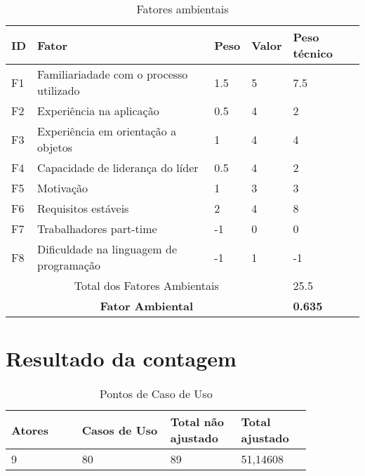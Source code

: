     \begin{table}[!h]
    \centering
    \caption{Fatores ambientais}
    \label{fatores_ambientais}
    \begin{tabular}{l|l|l|l|l}
    \hline
    ID  & Fator                                                          & Peso & Valor & Peso técnico\\
    \hline
    F1  & Familiariadade com o processo utilizado                        &  1.5  &  5  & 7.5  \\
    F2  & Experiência na aplicação                                       &  0.5  &  4  & 2  \\
    F3  & Experiência em orientação a objetos                            &   1   &  4  & 4  \\
    F4  & Capacidade de liderança do líder                               &  0.5  &  4  & 2  \\
    F5  & Motivação                                                      &   1   &  3  & 3  \\
    F6  & Requisitos estáveis                                            &   2   &  4  & 8  \\
    F7  & Trabalhadores part-time                                        &  -1   &  0  & 0  \\
    F8  & Dificuldade na linguagem de programação                        &  -1   &  1  & -1  \\
    \hline
    \multicolumn{4}{c}{Total dos Fatores Ambientais} & 25.5\\
    \hline
    \multicolumn{4}{c}{\textbf{Fator Ambiental}} & \textbf{0.635}\\
    \hline
    \end{tabular}
    \end{table}

\section{Resultado da contagem}

\begin{table*}[!h]
\centering
\caption{Pontos de Caso de Uso}
\label{Rotulo}
  \begin{tabular}{|p{0.20\linewidth}|p{0.25\linewidth}|p{0.20\linewidth}|p{0.20\linewidth}|}
  \hline
  \textbf{Atores} & \textbf{Casos de Uso} & \textbf{Total não ajustado} & \textbf{Total ajustado} \\ 
  \hline

  9 & 80 & 89 & 51,14608\\
  \hline
  \end{tabular}
\end{table*}